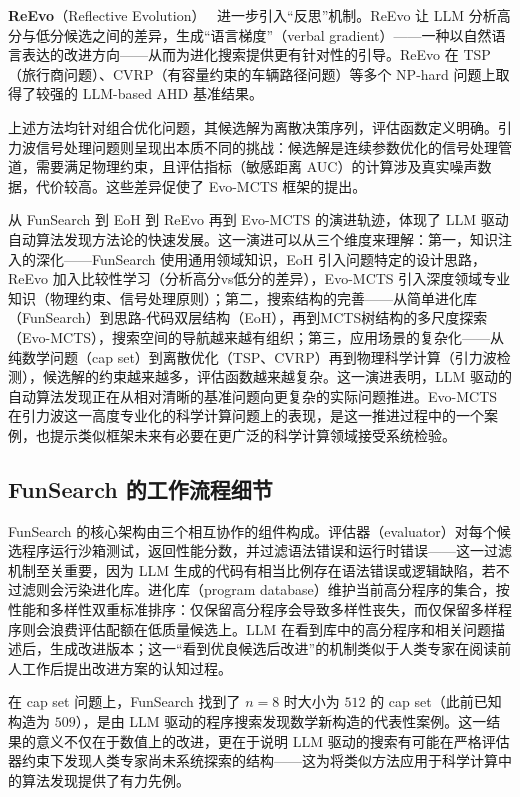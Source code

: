 \textbf{ReEvo}（Reflective Evolution）~\cite{ye2024reevo} 进一步引入“反思”机制。ReEvo 让 LLM 分析高分与低分候选之间的差异，生成“语言梯度”（verbal gradient）——一种以自然语言表达的改进方向——从而为进化搜索提供更有针对性的引导。ReEvo 在 TSP（旅行商问题）、CVRP（有容量约束的车辆路径问题）等多个 NP-hard 问题上取得了较强的 LLM-based AHD 基准结果。

上述方法均针对组合优化问题，其候选解为离散决策序列，评估函数定义明确。引力波信号处理问题则呈现出本质不同的挑战：候选解是连续参数优化的信号处理管道，需要满足物理约束，且评估指标（敏感距离 AUC）的计算涉及真实噪声数据，代价较高。这些差异促使了 Evo-MCTS 框架的提出。

从 FunSearch 到 EoH 到 ReEvo 再到 Evo-MCTS 的演进轨迹，体现了 LLM 驱动自动算法发现方法论的快速发展。这一演进可以从三个维度来理解：第一，知识注入的深化——FunSearch 使用通用领域知识，EoH 引入问题特定的设计思路，ReEvo 加入比较性学习（分析高分vs低分的差异），Evo-MCTS 引入深度领域专业知识（物理约束、信号处理原则）；第二，搜索结构的完善——从简单进化库（FunSearch）到思路-代码双层结构（EoH），再到MCTS树结构的多尺度探索（Evo-MCTS），搜索空间的导航越来越有组织；第三，应用场景的复杂化——从纯数学问题（cap set）到离散优化（TSP、CVRP）再到物理科学计算（引力波检测），候选解的约束越来越多，评估函数越来越复杂。这一演进表明，LLM 驱动的自动算法发现正在从相对清晰的基准问题向更复杂的实际问题推进。Evo-MCTS 在引力波这一高度专业化的科学计算问题上的表现，是这一推进过程中的一个案例，也提示类似框架未来有必要在更广泛的科学计算领域接受系统检验。

\subsection{FunSearch 的工作流程细节}

FunSearch 的核心架构由三个相互协作的组件构成。评估器（evaluator）对每个候选程序运行沙箱测试，返回性能分数，并过滤语法错误和运行时错误——这一过滤机制至关重要，因为 LLM 生成的代码有相当比例存在语法错误或逻辑缺陷，若不过滤则会污染进化库。进化库（program database）维护当前高分程序的集合，按性能和多样性双重标准排序：仅保留高分程序会导致多样性丧失，而仅保留多样程序则会浪费评估配额在低质量候选上。LLM 在看到库中的高分程序和相关问题描述后，生成改进版本；这一“看到优良候选后改进”的机制类似于人类专家在阅读前人工作后提出改进方案的认知过程。

在 cap set 问题上，FunSearch 找到了 $n=8$ 时大小为 $512$ 的 cap set（此前已知构造为 $509$），是由 LLM 驱动的程序搜索发现数学新构造的代表性案例。这一结果的意义不仅在于数值上的改进，更在于说明 LLM 驱动的搜索有可能在严格评估器约束下发现人类专家尚未系统探索的结构——这为将类似方法应用于科学计算中的算法发现提供了有力先例。

